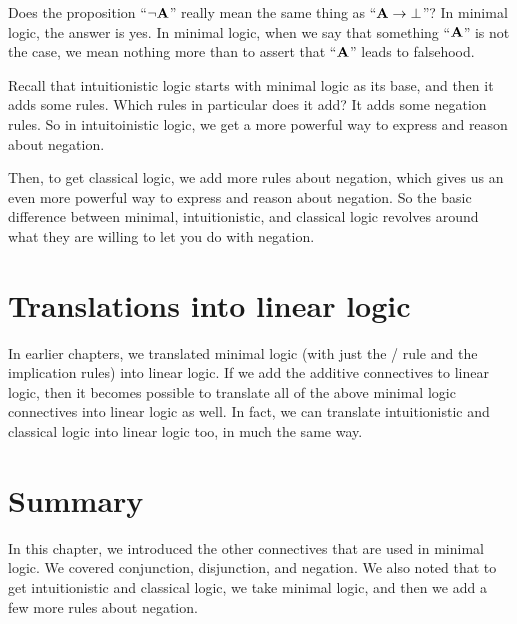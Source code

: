 \documentclass[../../../main.tex]{subfiles}
\begin{document}
Does the proposition ``$\neg/ \nd{A}$'' really mean the same thing as ``$\nd{A} \impl/ \falsum/$''? In minimal logic, the answer is yes. In minimal logic, when we say that something ``$\mathbf{A}$'' is not the case, we mean nothing more than to assert that ``$\mathbf{A}$'' leads to falsehood.

Recall that intuitionistic logic starts with minimal logic as its base, and then it adds some rules. Which rules in particular does it add? It adds some negation rules. So in intuitoinistic logic, we get a more powerful way to express and reason about negation.

Then, to get classical logic, we add more rules about negation, which gives us an even more powerful way to express and reason about negation. So the basic difference between minimal, intuitionistic, and classical logic revolves around what they are willing to let you do with negation.


\section{Translations into linear logic}

In earlier chapters, we translated minimal logic (with just the \startrule/ rule and the implication rules) into linear logic. If we add the additive connectives to linear logic, then it becomes possible to translate all of the above minimal logic connectives into linear logic as well. In fact, we can translate intuitionistic and classical logic into linear logic too, in much the same way.


\section{Summary}

In this chapter, we introduced the other connectives that are used in minimal logic. We covered conjunction, disjunction, and negation. We also noted that to get intuitionistic and classical logic, we take minimal logic, and then we add a few more rules about negation.
\end{document}
